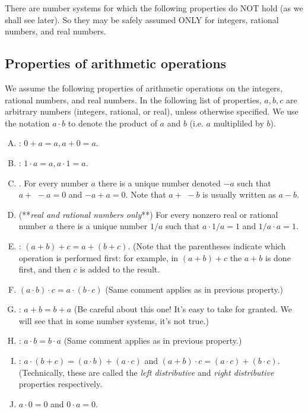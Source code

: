 \begin{warn}
There are number systems for which the following properties do NOT hold (as we shall see later). So they may be safely assumed ONLY for integers, rational numbers, and real numbers.
\end{warn}

\subsection{Properties of arithmetic operations}
\label{OpsAndRels}

We assume the following properties of arithmetic operations on the integers, rational numbers, and real numbers. In the following list of properties, $a,b,c$ are arbitrary numbers (integers, rational, or real), unless otherwise specified. We use the notation $a \cdot b$ to denote the product of $a$ and $b$ (i.e. $a$ multipliled by $b$).

\begin{enumerate}[(A)]
\item
{}:   $0+a =a, a+0=a$.
\item
{}:   $1 \cdot a =a, a \cdot 1=a$.
\item
{}. For every number $a$ there is a unique number denoted $-a$ such that $a + \,\,-a=0$ and $-a + a = 0$.   Note that $a +\,\,-b$ is usually written as $a-b$.
\item
{} (**\emph{real and rational numbers only}**)   For every nonzero real or rational number $a$ there is a unique number $1/a$ such that $a \cdot 1/a = 1$ and $1/a \cdot a = 1$.  
\item
{}: $(a+b)+c = a+(b+c)$.  (Note that the parentheses indicate which operation is performed first: for example, in $(a+b)+c$ the $a+b$ is done first, and then $c$ is added to the result. 
\item
{} $(a\cdot b) \cdot c= a\cdot(b\cdot c)$  (Same comment applies as in previous property.)
\item
{}: $a+b = b+a$  (Be careful about this one!  It's easy to take for granted.  We will see that in some number systems, it's not true.)
\item
{}: $a\cdot b = b\cdot a$  (Same comment applies as in previous property.)
\item
{}:   $a\cdot (b + c) = (a\cdot b) + (a \cdot c)$ and $(a+b)\cdot c = (a \cdot c) + (b \cdot c)$.  (Technically, these are called the  \emph{left distributive} and \emph{right distributive} properties respectively.
\item {}
$a \cdot 0 = 0$ and $0 \cdot a = 0$.
\end {enumerate}


